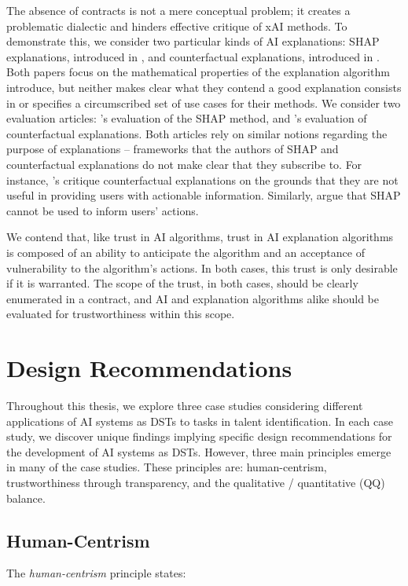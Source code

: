 The absence of contracts is not a mere conceptual problem; it creates a problematic dialectic and hinders effective critique of xAI methods. To demonstrate this, we consider two particular kinds of AI explanations: SHAP explanations, introduced in \textcite{lundberg_unified_2017}, and counterfactual explanations, introduced in \textcite{wachter_counterfactual_2017}. Both papers focus on the mathematical properties of the explanation algorithm introduce, but neither makes clear what they contend a good explanation consists in or specifies a circumscribed set of use cases for their methods. We consider two evaluation articles: \textcite{kumar_problems_2020}'s evaluation of the SHAP method, and \textcite{barocas_hidden_2020}'s evaluation of counterfactual explanations. Both articles rely on similar notions regarding the purpose of explanations – frameworks that the authors of SHAP and counterfactual explanations do not make clear that they subscribe to. For instance, \textcite{barocas_hidden_2020}'s critique counterfactual explanations on the grounds that they are not useful in providing users with actionable information. Similarly, \textcite{kumar_problems_2020} argue that SHAP cannot be used to inform users' actions.

We contend that, like trust in AI algorithms, trust in AI explanation algorithms is composed of an ability to anticipate the algorithm and an acceptance of vulnerability to the algorithm's actions. In both cases, this trust is only desirable if it is warranted. The scope of the trust, in both cases, should be clearly enumerated in a contract, and AI and explanation algorithms alike should be evaluated for trustworthiness within this scope.

\section{Design Recommendations}
Throughout this thesis, we explore three case studies considering different applications of AI systems as DSTs to tasks in talent identification. In each case study, we discover unique findings implying specific design recommendations for the development of AI systems as DSTs. However, three main principles emerge in many of the case studies. These principles are: human-centrism, trustworthiness through transparency, and the qualitative / quantitative (QQ) balance.

\subsection{Human-Centrism}
The \emph{human-centrism} principle states:


